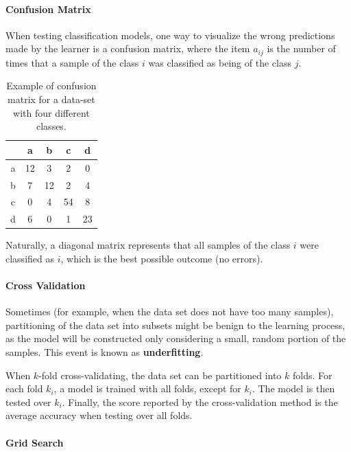 \documentclass[12pt]{article}
\begin{document}
\paragraph{Confusion Matrix}

When testing classification models, one way to visualize the wrong predictions made by the learner is a confusion matrix, where the item $a_{ij}$ is the number of times that a sample of the class $i$ was classified as being of the class $j$.

\begin{table}[H]
	\centering
	\begin{tabular}{ |c || *{4}{c|} }
		\hline
           &   a &   b &   c &   d \\\hline\hline
		a & 12 &   3 &   2 &   0 \\
		b &   7 & 12 &   2 &   4 \\
		c &   0 &   4 & 54 &   8 \\
		d &   6 &   0 &   1 & 23 \\\hline
	\end{tabular}

	\caption{Example of confusion matrix for a data-set with four different classes.}
\end{table}

Naturally, a diagonal matrix represents that all samples of the class $i$ were classified as $i$, which is the best possible outcome (no errors).

\paragraph{Cross Validation}

Sometimes (for example, when the data set does not have too many samples), partitioning of the data set into subsets might be benign to the learning process, as the model will be constructed only considering a small, random portion of the samples. This event is known as \textbf{underfitting}.

When $k$-fold cross-validating, \cite{crossvalid} the data set can be partitioned into $k$ folds. For each fold $k_i$, a model is trained with all folds, except for $k_i$. The model is then tested over $k_i$. Finally, the score reported by the cross-validation method is the average accuracy when testing over all folds.

\paragraph{Grid Search}
\end{document}

